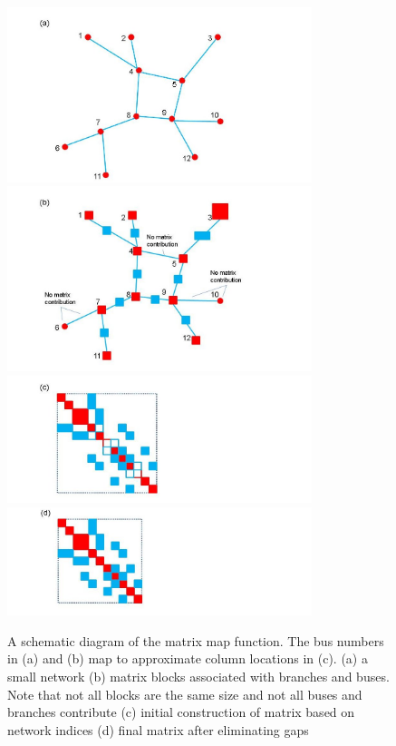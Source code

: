 \documentclass{acm_proc_article-sp}
\begin{document}
\begin{figure}
\centering
\includegraphics[width=3.5in,keepaspectratio=true]{./Fig1a}
\includegraphics[width=3.5in,keepaspectratio=true]{./Fig1b}
\includegraphics[width=3.5in,keepaspectratio=true]{./Fig1c}
\includegraphics[width=3.5in,keepaspectratio=true]{./Fig1d}
\caption{\label{mapper} A schematic diagram of the matrix map function.
The bus numbers in (a) and (b) map to approximate column locations in (c).
(a) a small network (b)
matrix blocks associated with branches and buses. Note that not all blocks are
the same size and not all buses and branches contribute (c) initial construction
of matrix based on network indices (d) final matrix after eliminating gaps}
\end{figure}
\end{document}
